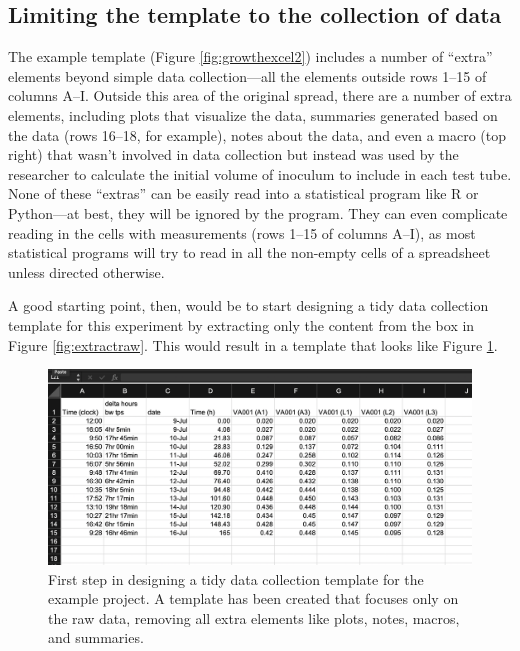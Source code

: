 \documentclass[]{tufte-book}
\begin{document}
\subsection{Limiting the template to the collection of data}\label{limiting-the-template-to-the-collection-of-data}

The example template (Figure \ref{fig:growthexcel2}) includes a number of
``extra'' elements beyond simple data collection---all the elements outside rows
1--15 of columns A--I. Outside this area of the original spread, there are a
number of extra elements, including plots that visualize the data, summaries
generated based on the data (rows 16--18, for example), notes about the data,
and even a macro (top right) that wasn't involved in data collection but instead
was used by the researcher to calculate the initial volume of inoculum to
include in each test tube. None of these ``extras'' can be easily read into a
statistical program like R or Python---at best, they will be ignored by the program.
They can even complicate reading in the cells with measurements (rows
1--15 of columns A--I), as most statistical programs will try to read in all the
non-empty cells of a spreadsheet unless directed otherwise.

A good starting point, then, would be to start designing a tidy data collection
template for this experiment by extracting only the content from the box in
Figure \ref{fig:extractraw}. This would result in a template that looks like
Figure \ref{fig:step1}.

\begin{figure}
\includegraphics[width=\textwidth]{figures/growth_curve_step1} \caption[First step in designing a tidy data collection template for the example project]{First step in designing a tidy data collection template for the example project. A template has been created that focuses only on the raw data, removing all extra elements like plots, notes, macros, and summaries.}\label{fig:step1}
\end{figure}
\end{document}
